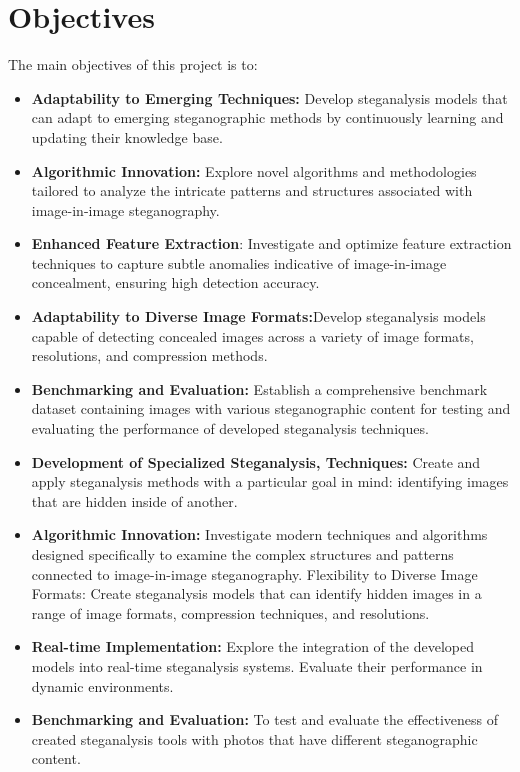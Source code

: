 \section{Objectives}
The main objectives of this project is to:
\begin{itemize}
\item \textbf{Adaptability to Emerging Techniques:} Develop steganalysis models that can adapt to emerging steganographic methods by continuously learning and updating their knowledge base.
\item \textbf{Algorithmic Innovation:} Explore novel algorithms and methodologies tailored to analyze the intricate patterns and structures associated with image-in-image steganography.
\item \textbf{Enhanced Feature Extraction}: Investigate and optimize feature extraction techniques to capture subtle anomalies indicative of image-in-image concealment, ensuring high detection accuracy.
\item \textbf{Adaptability to Diverse Image Formats:}Develop steganalysis models capable of detecting concealed images across a variety of image formats, resolutions, and compression methods.
\item \textbf{Benchmarking and Evaluation:} Establish a comprehensive benchmark dataset containing images with various steganographic content for testing and evaluating the performance of developed steganalysis techniques.
\item \textbf{Development of Specialized Steganalysis, Techniques:} Create and apply steganalysis methods with a particular goal in mind: identifying images that are hidden inside of another.
\item \textbf{Algorithmic Innovation:} Investigate modern techniques and algorithms designed specifically to examine the complex structures and patterns connected to image-in-image steganography.
Flexibility to Diverse Image Formats: Create steganalysis models that can identify hidden images in a range of image formats, compression techniques, and resolutions.
\item \textbf{Real-time Implementation:} Explore the integration of the developed models into real-time steganalysis systems. Evaluate their performance in dynamic environments.
\item \textbf{Benchmarking and Evaluation:} To test and evaluate the effectiveness of created steganalysis tools with photos that have different steganographic content.
\end{itemize}

